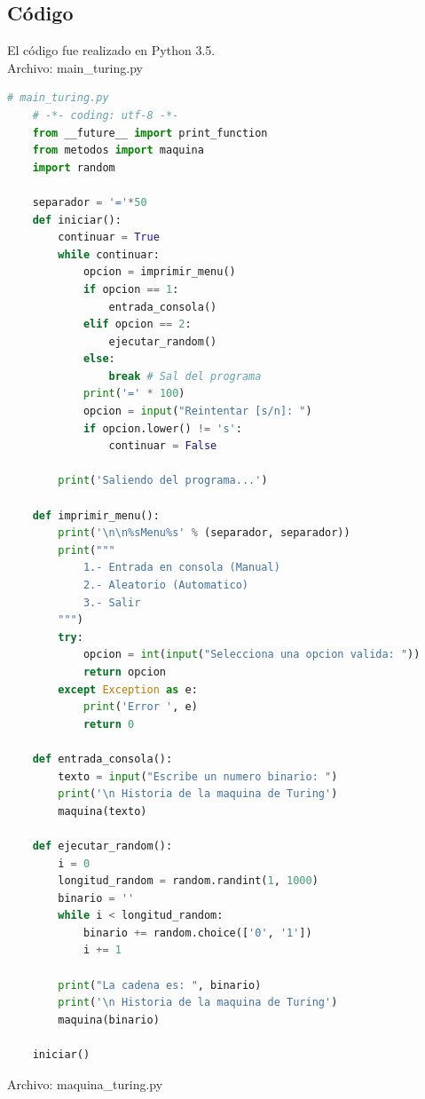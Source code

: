 	\subsection{Código}
	El código fue realizado en Python 3.5.
	\\Archivo: main\_turing.py
	\begin{lstlisting}[language=Python]
	# main_turing.py
	# -*- coding: utf-8 -*-
	from __future__ import print_function
	from metodos import maquina
	import random

	separador = '='*50
	def iniciar():
	    continuar = True
	    while continuar:
	        opcion = imprimir_menu()
	        if opcion == 1:
	            entrada_consola()
	        elif opcion == 2:
	            ejecutar_random()
	        else:
	            break # Sal del programa
	        print('=' * 100)
	        opcion = input("Reintentar [s/n]: ")
	        if opcion.lower() != 's':
	            continuar = False

	    print('Saliendo del programa...')

	def imprimir_menu():
	    print('\n\n%sMenu%s' % (separador, separador))
	    print("""
	        1.- Entrada en consola (Manual)
	        2.- Aleatorio (Automatico)
	        3.- Salir
	    """)
	    try:
	        opcion = int(input("Selecciona una opcion valida: "))
	        return opcion
	    except Exception as e:
	        print('Error ', e)
	        return 0

	def entrada_consola():
	    texto = input("Escribe un numero binario: ")
	    print('\n Historia de la maquina de Turing')
	    maquina(texto)

	def ejecutar_random():
	    i = 0
	    longitud_random = random.randint(1, 1000)
	    binario = ''
	    while i < longitud_random:
	        binario += random.choice(['0', '1'])
	        i += 1

	    print("La cadena es: ", binario)
	    print('\n Historia de la maquina de Turing')
	    maquina(binario)

	iniciar()
	\end{lstlisting}
	Archivo: maquina\_turing.py
